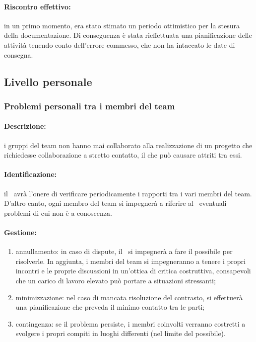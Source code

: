 \documentclass[../PianoProgetto.tex]{subfiles}
\begin{document}
	\paragraph*{Riscontro effettivo:} in un primo momento, era stato stimato un periodo ottimistico per la stesura della documentazione. Di conseguenza è stata rieffettuata una pianificazione delle attività tenendo conto dell'errore commesso, che non ha intaccato le date di consegna.


\subsection{Livello personale}

\subsubsection{Problemi personali tra i membri del team}

	\paragraph*{Descrizione:} i gruppi del team non hanno mai collaborato alla realizzazione di un progetto che richiedesse collaborazione a stretto contatto, il che può causare attriti tra essi.
	
	\paragraph*{Identificazione:} il \responsabilediprogetto\ avrà l'onere di verificare periodicamente i rapporti tra i vari membri del team. D'altro canto, ogni membro del team si impegnerà a riferire al \responsabilediprogetto\ eventuali problemi di cui non è a conoscenza.
	
	\paragraph*{Gestione:}
	\begin{enumerate}
		\item annullamento: in caso di dispute, il \responsabilediprogetto\ si impegnerà a fare il possibile per risolverle. In aggiunta, i membri del team si impegneranno a tenere i propri incontri e le proprie discussioni in un'ottica di critica costruttiva, consapevoli che un carico di lavoro elevato può portare a situazioni stressanti;
		\item minimizzazione: nel caso di mancata risoluzione del contrasto, si effettuerà una pianificazione che preveda il minimo contatto tra le parti; 
		\item contingenza: se il problema persiste, i membri coinvolti verranno costretti a svolgere i propri compiti in luoghi differenti (nel limite del possibile).
	\end{enumerate}	
	
\end{document}
